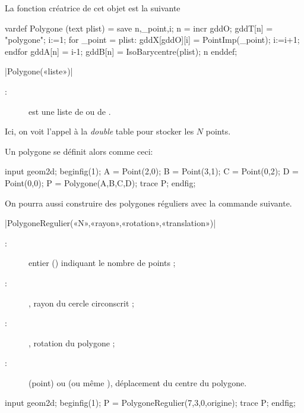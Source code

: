 \documentclass[a4paper,french]{article}
\begin{document}
La fonction créatrice de cet objet est la suivante
\begin{mpcode}
vardef Polygone (text plist) =
  save n,_point,i; n = incr gddO; gddT[n] = "polygone";
  i:=1;
  for _point = plist:
    gddX[gddO][i] = PointImp(_point);
    i:=i+1;
  endfor
  gddA[n] = i-1; %
  gddB[n] = IsoBarycentre(plist); %
  n
enddef;
\end{mpcode}

\begin{colourband}
\macro|Polygone(«liste»)|
\begin{description}
  \item[:] est une liste de  ou de .
\end{description}
\end{colourband}


\bigskip

Ici, on voit l'appel à la \emph{double} table  pour stocker
les $N$ points.

Un polygone se définit alors comme ceci:
\begin{ExempleMP}
input geom2d;
beginfig(1);
A = Point(2,0);
B = Point(3,1);
C = Point(0,2);
D = Point(0,0);
P = Polygone(A,B,C,D);
trace P;
endfig;
\end{ExempleMP}

On pourra aussi construire des polygones réguliers avec la commande suivante.
\begin{colourband}
\macro|PolygoneRegulier(«N»,«rayon»,«rotation»,«translation»)|
\begin{description}
  \item[:] entier () indiquant le nombre de points ;
  \item[:] , rayon du cercle circonscrit ;
  \item[:]  , rotation du polygone ;
  \item[:]  \typeGDD(point) ou  (ou même
  ), déplacement du centre du polygone.
\end{description}
\end{colourband}

\begin{ExempleMP}
  input geom2d;
  beginfig(1);
  P = PolygoneRegulier(7,3,0,origine);
  trace P;
  endfig;
  \end{ExempleMP}
\end{document}
